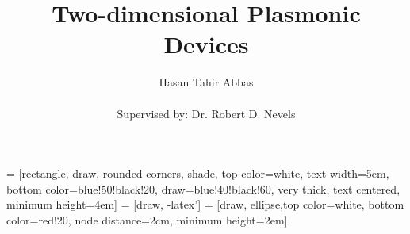 \documentclass[mathserif,18pt,xcolor=table]{beamer}
\title{Two-dimensional Plasmonic Devices}
\author[Hasan Tahir Abbas]{Hasan Tahir Abbas\\~\\{\small {Supervised by: Dr. Robert D. Nevels}}}
\institute{Department of Electrical  \& Computer Engineering\\ \mbox{} \\ \pgfuseimage{tamuecenbig}}
\date[Spring 2017]{}
\begin{document}
\preto\subequations{\ifhmode\unskip\fi}
 = [rectangle, draw, rounded corners, shade, top color=white, text width=5em,
bottom color=blue!50!black!20, draw=blue!40!black!60, very thick, text centered, minimum height=4em]
 = [draw, -latex']
 = [draw, ellipse,top color=white, bottom color=red!20, node distance=2cm, minimum height=2em]

\beamertemplateballitem

\frame{\titlepage}


%
%
\end{document}
